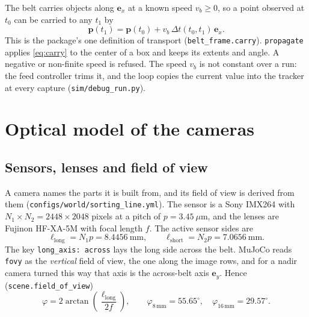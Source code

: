 \documentclass[11pt,a4paper]{article}
\theoremstyle{definition}
\theoremstyle{remark}
\newcommand{\ex}{\mathbf{e}_x}
\newcommand{\ey}{\mathbf{e}_y}
\newcommand{\code}[1]{\texttt{#1}}
\begin{document}
The belt carries objects along $\ex$ at a known speed $v_b \ge 0$, so a point
observed at $t_0$ can be carried to any $t_1$ by
\begin{equation}
\label{eq:carry}
\mathbf{p}(t_1) = \mathbf{p}(t_0) + v_b\,\Delta t(t_0,t_1)\,\ex .
\end{equation}
This is the package's one definition of transport (\code{belt\_frame.carry}).
\code{propagate} applies \eqref{eq:carry} to the center of a box and keeps its
extents and angle. A negative or non-finite speed is refused. The speed $v_b$ is
not constant over a run: the feed controller trims it, and the loop copies the
current value into the tracker at every capture (\code{sim/debug\_run.py}).

\section{Optical model of the cameras}
\label{sec:optics}

\subsection{Sensors, lenses and field of view}

A camera names the parts it is built from, and its field of view is derived
from them (\code{configs/world/sorting\_line.yml}). The sensor is a Sony IMX264
with $N_1\times N_2 = 2448\times 2048$ pixels at a pitch of $p = 3.45\ \mu$m, and
the lenses are Fujinon HF-XA-5M with focal length $f$. The active sensor sides
are
\begin{equation}
\ell_{\text{long}} = N_1 p = 8.4456\ \text{mm},\qquad
\ell_{\text{short}} = N_2 p = 7.0656\ \text{mm}.
\end{equation}
The key \code{long\_axis: across} lays the long side across the belt. MuJoCo
reads \code{fovy} as the \emph{vertical} field of view, the one along the image
rows, and for a nadir camera turned this way that axis is the across-belt axis
$\ey$. Hence (\code{scene.field\_of\_view})
\begin{equation}
\label{eq:fovy}
\varphi = 2\arctan\!\left(\frac{\ell_{\text{long}}}{2f}\right),
\qquad
\varphi_{8\,\text{mm}} = 55.65^\circ,\quad
\varphi_{16\,\text{mm}} = 29.57^\circ .
\end{equation}
\end{document}
